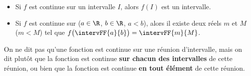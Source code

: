 \begin{propriete}[s]
	\begin{itemize}
		\item Si $f$ est continue sur un intervalle $I$, alors $f(I)$ est un intervalle.
		\item Si $f$ est continue sur  ($a\in \R$, $b\in \R$, $a<b$), alors il existe deux réels $m$ et $M$ ($m<M$) tel que $f\big(\intervFF{a}{b}\big)=\intervFF{m}{M}$.
	\end{itemize}
\end{propriete}

\begin{remark}
On ne dit pas qu'une fonction est continue sur une réunion d'intervalle, mais on dit plutôt que la fonction est continue \textbf{sur chacun des intervalles} de cette réunion, ou bien que la fonction est continue \textbf{en tout élément} de cette réunion.
\end{remark}
